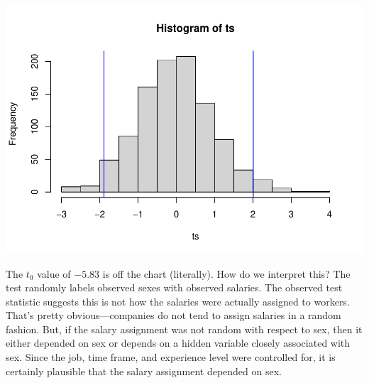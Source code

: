 \documentclass[
]{book}
\begin{document}
\includegraphics{03-RandomizationTests_files/figure-latex/unnamed-chunk-4-1.pdf}

The \(t_0\) value of \(-5.83\) is off the chart (literally). How do we interpret this? The test randomly labels observed sexes with observed salaries. The observed test statistic suggests this is not how the salaries were actually assigned to workers. That's pretty obvious---companies do not tend to assign salaries in a random fashion. But, if the salary assignment was not random with respect to sex, then it either depended on sex or depends on a hidden variable closely associated with sex. Since the job, time frame, and experience level were controlled for, it is certainly plausible that the salary assignment depended on sex.
\end{document}
